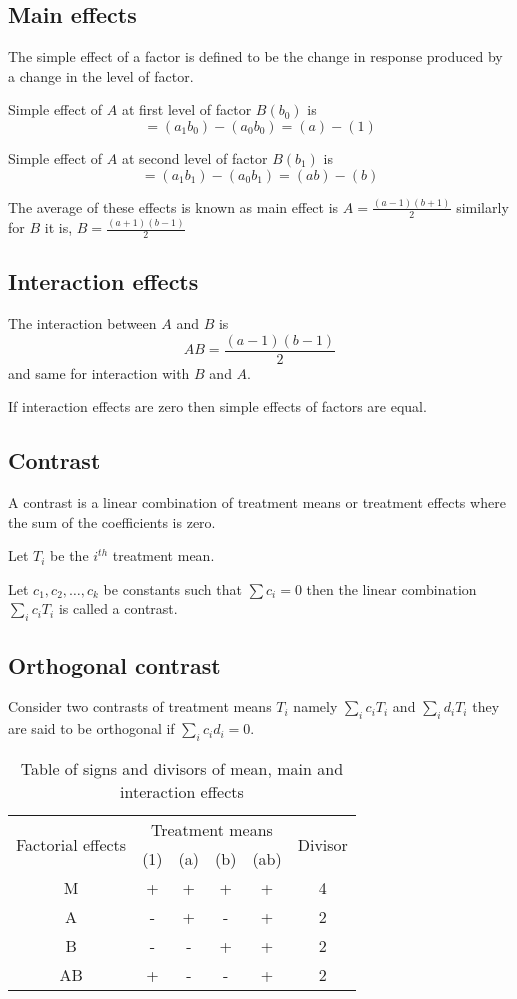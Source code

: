 \documentclass[oneside,11pt,pdftex]{book}%
\numberwithin{equation}{section}
\numberwithin{section}{chapter}
\numberwithin{equation}{chapter}
\begin{document}
\subsection{Main effects}
	
The simple effect of a factor is defined to be the change in response produced by a change in the level of factor.

Simple effect of $ A $ at first level of factor $ B(b_0) $ is \[ =(a_1b_0)-(a_0b_0) =(a)-(1)\]

Simple effect of $ A $ at second level of factor $ B(b_1) $ is \[ =(a_1b_1)-(a_0b_1) =(ab)-(b)\]

The average of these effects is known as main effect is $ A=\frac{(a-1)(b+1)}{2} $ similarly for $ B $ it is, $ B=\frac{(a+1)(b-1)}{2} $

\subsection{Interaction effects}
The interaction between $ A $ and $ B $ is 
\[ AB=\frac{(a-1)(b-1)}{2} \] and same for interaction with $ B $ and $ A $.

If interaction effects are zero then simple effects of factors are equal.
\subsection{Contrast}
A contrast is a linear combination of treatment means or treatment effects where the sum of the coefficients is zero.

Let $ T_i $ be the $ i^{th} $ treatment mean.

Let $ c_1,c_2,\dots,c_k $ be constants such that $ \sum c_i=0 $ then the linear combination $ \sum_i c_iT_i $ is called a contrast.
\subsection{Orthogonal contrast}
Consider two contrasts of treatment means $ T_i $ namely $ \sum_i c_iT_i $ and $ \sum_i d_iT_i $ they are said to be orthogonal if $ \sum_i c_id_i =0$.

\begin{table}[!htb]
	\centering
	\begin{tabular}{@{}cccccc@{}}
		\toprule
		\multirow{2}{*}{Factorial effects} & \multicolumn{4}{c}{Treatment means} & \multirow{2}{*}{Divisor} \\ \cmidrule(lr){2-5}
		& (1) & (a) & (b) & (ab) &  \\ \midrule
		M & + & + & + & + & 4 \\
		A & - & + & - & + & 2 \\
		B & - & - & + & + & 2 \\
		AB & + & - & - & + & 2 \\ \bottomrule
	\end{tabular}
	\caption{Table of signs and divisors of mean, main and interaction effects}
	\label{tab:tableofsigns}
\end{table}
\end{document}
